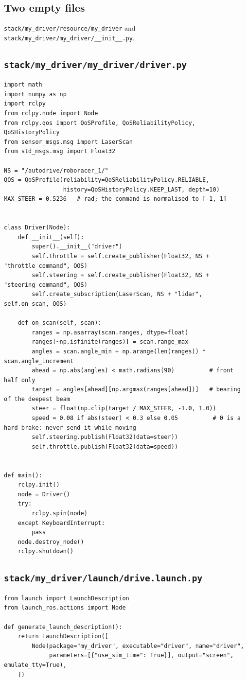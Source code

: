 \documentclass[11pt,a4paper]{article}
\begin{document}
\subsection*{Two empty files}
\texttt{stack/my\_driver/resource/my\_driver} and \texttt{stack/my\_driver/my\_driver/\_\_init\_\_.py}.

\subsection*{\texttt{stack/my\_driver/my\_driver/driver.py}}
\begin{lstlisting}
import math
import numpy as np
import rclpy
from rclpy.node import Node
from rclpy.qos import QoSProfile, QoSReliabilityPolicy, QoSHistoryPolicy
from sensor_msgs.msg import LaserScan
from std_msgs.msg import Float32

NS = "/autodrive/roboracer_1/"
QOS = QoSProfile(reliability=QoSReliabilityPolicy.RELIABLE,
                 history=QoSHistoryPolicy.KEEP_LAST, depth=10)
MAX_STEER = 0.5236   # rad; the command is normalised to [-1, 1]


class Driver(Node):
    def __init__(self):
        super().__init__("driver")
        self.throttle = self.create_publisher(Float32, NS + "throttle_command", QOS)
        self.steering = self.create_publisher(Float32, NS + "steering_command", QOS)
        self.create_subscription(LaserScan, NS + "lidar", self.on_scan, QOS)

    def on_scan(self, scan):
        ranges = np.asarray(scan.ranges, dtype=float)
        ranges[~np.isfinite(ranges)] = scan.range_max
        angles = scan.angle_min + np.arange(len(ranges)) * scan.angle_increment
        ahead = np.abs(angles) < math.radians(90)          # front half only
        target = angles[ahead][np.argmax(ranges[ahead])]   # bearing of the deepest beam
        steer = float(np.clip(target / MAX_STEER, -1.0, 1.0))
        speed = 0.08 if abs(steer) < 0.3 else 0.05          # 0 is a hard brake: never send it while moving
        self.steering.publish(Float32(data=steer))
        self.throttle.publish(Float32(data=speed))


def main():
    rclpy.init()
    node = Driver()
    try:
        rclpy.spin(node)
    except KeyboardInterrupt:
        pass
    node.destroy_node()
    rclpy.shutdown()
\end{lstlisting}

\subsection*{\texttt{stack/my\_driver/launch/drive.launch.py}}
\begin{lstlisting}
from launch import LaunchDescription
from launch_ros.actions import Node

def generate_launch_description():
    return LaunchDescription([
        Node(package="my_driver", executable="driver", name="driver",
             parameters=[{"use_sim_time": True}], output="screen", emulate_tty=True),
    ])
\end{lstlisting}
\end{document}
